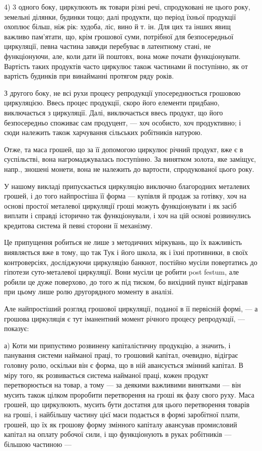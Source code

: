 4) 3 одного боку, циркулюють як товари різні речі, спродуковані
не цього року, земельні ділянки, будинки тощо; далі продукти, що
період їхньої продукції охоплює більш, ніж рік: худоба, ліс, вино й т. ін.
Для цих та інших явищ важливо пам’ятати, що, крім грошової суми,
потрібної для безпосередньої циркуляції, певна частина завжди перебуває
в латентному стані, не функціонуючи, але, коли дати їй поштовх, вона
може почати функціонувати. Вартість таких продуктів часто циркулює
також частинами й поступінно, як от вартість будинків при винайманні
протягом ряду років.

З другого боку, не всі рухи процесу репродукції упосереднюється
грошовою циркуляцією. Ввесь процес продукції, скоро його елементи
придбано, виключається з циркуляції. Далі, виключається ввесь продукт,
що його безпосередньо споживає сам продуцент, — хоч особисто, хоч
продуктивно; і сюди належить також харчування сільських робітників
натурою.

Отже, та маса грошей, що за її допомогою циркулює річний продукт,
вже є в суспільстві, вона нагромаджувалась поступінно. За винятком золота,
яке заміщує, напр., зношені монети, вона не належить до вартости,
спродукованої цього року.

У нашому викладі припускається циркуляцію виключно благородних
металевих грошей, і до того найпростіша її форма — купівля й продаж
за готівку, хоч на основі простої металевої циркуляції гроші можуть
функціонувати і як засіб виплати і справді історично так функціонували,
і хоч на цій основі розвинулись кредитова система й певні сторони
її механізму.

Це припущення робиться не лише з методичних міркувань, що їх важливість
виявляється вже в тому, що так Тук і його школа, як і їхні противники,
в своїх контроверсіях, досліджуючи циркуляцію банкнот, постійно
мусіли повертатись до гіпотези суто-металевої циркуляції. Вони мусіли
це робити post festum, але робили це дуже поверхово, до того ж під
тиском, бо вихідний пункт відігравав при цьому лише ролю другорядного
моменту в аналізі.

Але найпростіший розгляд грошової циркуляції, поданої в її первісній
формі, — а грошова циркуляція є тут іманентний момент річного процесу
репродукції, — показує:

а) Коти ми припустимо розвинену капіталістичну продукцію, а значить,
і панування системи найманої праці, то грошовий капітал, очевидно,
відіграє головну ролю, оскільки він є форма, що в ній авансується
змінний капітал. В міру того, як розвивається система найманої праці,
кожен продукт перетворюється на товар, а тому — за деякими важливими
винятками — він мусить також цілком проробити перетворення на
гроші як фазу свого руху. Маса грошей, що циркулюють, мусить бути
достатня для цього перетворення товарів на гроші, і найбільшу частину
цієї маси подається в формі заробітної плати, грошей, що їх як грошову
форму змінного капіталу авансував промисловий капітал на оплату робочої
сили, і що функціонують в руках робітників — більшою частиною —
\parbreak{}  %
